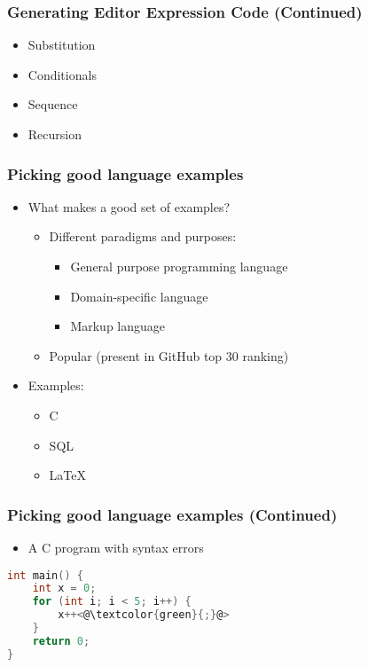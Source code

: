 \documentclass[t,24pt,aspectratio=169]{beamer}
\begin{document}
\begin{frame}[hvid]
    \frametitle{Generating Editor Expression Code (Continued)}
    \begin{itemize}
        \item Substitution
        \item Conditionals
        \item Sequence
        \item Recursion
    \end{itemize}
\end{frame}

\begin{frame}[hvid]
    \frametitle{Picking good language examples}
    \begin{itemize}
        \item What makes a good set of examples?
              \begin{itemize}
                  \item Different paradigms and purposes:
                        \begin{itemize}
                            \item General purpose programming language
                            \item Domain-specific language
                            \item Markup language
                        \end{itemize}
                  \item Popular (present in GitHub top 30 ranking)
              \end{itemize}
              \pause
        \item Examples:
              \begin{itemize}
                  \item C
                  \item SQL
                  \item \LaTeX
              \end{itemize}
    \end{itemize}
\end{frame}

\begin{frame}[fragile]
    \frametitle{Picking good language examples (Continued)}

    \begin{multicols}{2}
        \begin{itemize}
            \item A C program with syntax errors

        \end{itemize}
        \columnbreak
        \begin{lstlisting}[language=c]
int main() {
    int x = 0;
    for (int i; i < 5; i++) {
        x++<@\textcolor{green}{;}@>
    }
    return 0;
}
    \end{lstlisting}
    \end{multicols}
\end{frame}
\end{document}
